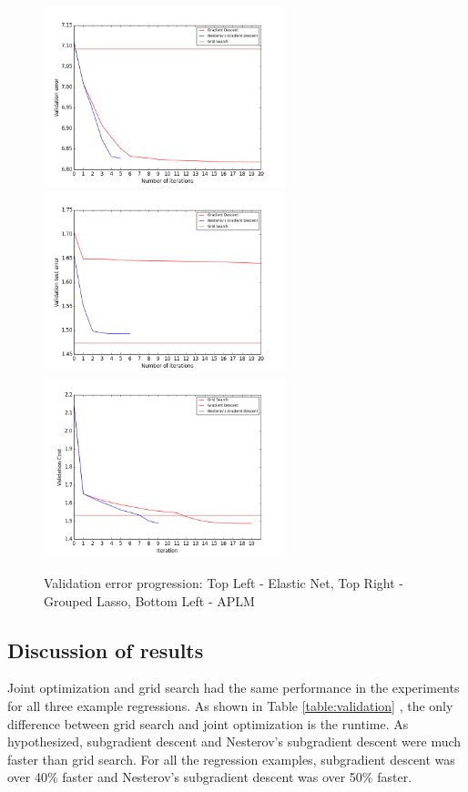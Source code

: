 \documentclass[10pt,letterpaper]{article}
\begin{document}
\begin{figure} 
\includegraphics[width=70mm]{elasticnet_costpath_80_250_15.png}
\includegraphics[width=70mm]{grouped_lasso_60_1500_3_150.png}
\includegraphics[width=70mm]{smooth_linear_simple_cost_path_1_100_20_6.png}
\caption{Validation error progression: Top Left - Elastic Net, Top Right - Grouped Lasso, Bottom Left - APLM}
\label{figure:costpath}
\end{figure}

\subsection{Discussion of results}

Joint optimization and grid search had the same performance in the experiments for all three example regressions. As shown in Table \ref{table:validation} ,
the only difference between grid search and joint optimization is the runtime. As hypothesized, subgradient descent and Nesterov's subgradient descent were much faster than grid search. For all the regression examples, subgradient descent was over 40\% faster and Nesterov's subgradient descent was over 50\% faster.
\end{document}
